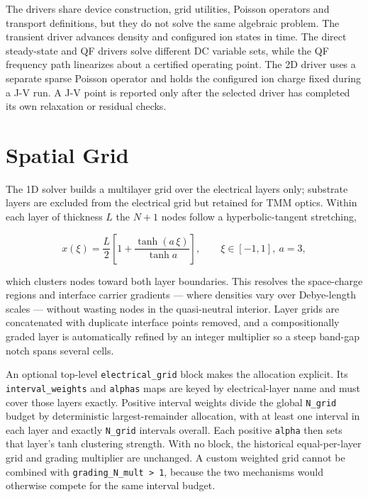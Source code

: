 \documentclass[
  11pt,
  american,
]{report}
\begin{document}
The drivers share device construction, grid utilities, Poisson operators
and transport definitions, but they do not solve the same algebraic
problem. The transient driver advances density and configured ion states
in time. The direct steady-state and QF drivers solve different DC
variable sets, while the QF frequency path linearizes about a certified
operating point. The 2D driver uses a separate sparse Poisson operator
and holds the configured ion charge fixed during a J-V run. A J-V point
is reported only after the selected driver has completed its own
relaxation or residual checks.

\hypertarget{spatial-grid}{%
\section{Spatial Grid}\label{spatial-grid}}

The 1D solver builds a multilayer grid over the electrical layers only;
substrate layers are excluded from the electrical grid but retained for
TMM optics. Within each layer of thickness \(L\) the \(N+1\) nodes
follow a hyperbolic-tangent stretching,

\begin{equation}
\label{eq:tanh-grid}
x(\xi)
=
\frac{L}{2}\left[1+\frac{\tanh(a\,\xi)}{\tanh a}\right],
\qquad \xi \in [-1, 1],\ a = 3,
\end{equation}

which clusters nodes toward both layer boundaries. This resolves the
space-charge regions and interface carrier gradients --- where densities
vary over Debye-length scales --- without wasting nodes in the
quasi-neutral interior. Layer grids are concatenated with duplicate
interface points removed, and a compositionally graded layer is
automatically refined by an integer multiplier so a steep band-gap notch
spans several cells.

An optional top-level \texttt{electrical\_grid} block makes the
allocation explicit. Its \texttt{interval\_weights} and \texttt{alphas}
maps are keyed by electrical-layer name and must cover those layers
exactly. Positive interval weights divide the global \texttt{N\_grid}
budget by deterministic largest-remainder allocation, with at least one
interval in each layer and exactly \texttt{N\_grid} intervals overall.
Each positive \texttt{alpha} then sets that layer's tanh clustering
strength. With no block, the historical equal-per-layer grid and grading
multiplier are unchanged. A custom weighted grid cannot be combined with
\texttt{grading\_N\_mult\ \textgreater{}\ 1}, because the two mechanisms
would otherwise compete for the same interval budget.
\end{document}
